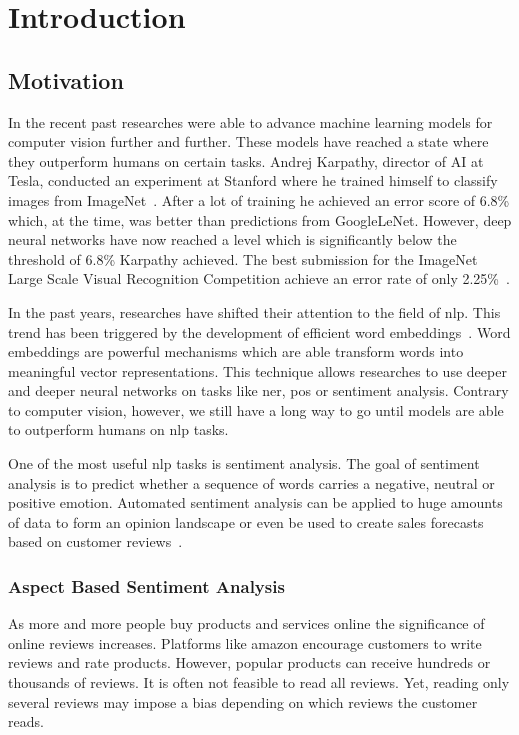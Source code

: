 \chapter{Introduction}
\label{chap:introduction}

\section{Motivation}
\label{sec:introduction_motivation}

In the recent past researches were able to advance machine learning models for computer vision further and further. These models have reached a state where they outperform humans on certain tasks. Andrej Karpathy, director of AI at Tesla, conducted an experiment at Stanford where he trained himself to classify images from ImageNet~\cite{Karpathy2014}. After a lot of training he achieved an error score of 6.8\% which, at the time, was better than predictions from GoogleLeNet. However, deep neural networks have now reached a level which is significantly below the threshold of 6.8\% Karpathy achieved. The best submission for the ImageNet Large Scale Visual Recognition Competition achieve an error rate of only 2.25\%~\cite{Hu2018}.
\bigskip

In the past years, researches have shifted their attention to the field of \acrfull{nlp}. This trend has been triggered by the development of efficient word embeddings~\cite{Mikolov2013c}. Word embeddings are powerful mechanisms which are able transform words into meaningful vector representations. This technique allows researches to use deeper and deeper neural networks on tasks like \gls{ner}, \gls{pos} or sentiment analysis. Contrary to computer vision, however, we still have a long way to go until models are able to outperform humans on \gls{nlp} tasks.
\bigskip

One of the most useful \gls{nlp} tasks is sentiment analysis. The goal of sentiment analysis is to predict whether a sequence of words carries a negative, neutral or positive emotion. Automated sentiment analysis can be applied to huge amounts of data to form an opinion landscape or even be used to create sales forecasts based on customer reviews~\cite{Shen2015}. 
\medskip

\subsection*{Aspect Based Sentiment Analysis}

As more and more people buy products and services online the significance of online reviews increases. Platforms like amazon encourage customers to write reviews and rate products. However, popular products can receive hundreds or thousands of reviews. It is often not feasible to read all reviews. Yet, reading only several reviews may impose a bias depending on which reviews the customer reads.
\medskip

